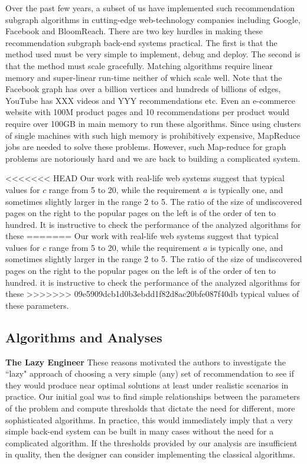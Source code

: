 Over the past few years, a subset of us have implemented such recommendation
subgraph algorithms in cutting-edge web-technology companies including Google,
Facebook and BloomReach. There are two key hurdles in making these
recommendation subgraph back-end systems practical. The first is that the method
used must be very simple to implement, debug and deploy. The second is that the
method must scale gracefully.  Matching algorithms require linear memory and
super-linear run-time neither of which scale well. Note that the Facebook graph
has over a billion vertices\cite{} and hundreds of billions of edges\cite{},
YouTube has XXX videos and YYY recommendations\cite{} etc. Even an e-commerce
website with 100M product pages and 10 recommendations per product would require
over 100GB in main memory to run these algorithms. Since using clusters of
single machines with such high memory is prohibitively expensive, MapReduce
\cite{} jobs are needed to solve these problems. However, such Map-reduce for
graph problems are notoriously hard and we are back to building a complicated
system. \vs

<<<<<<< HEAD
Our work with real-life web systems suggest that typical values for $c$ range
from 5 to 20, while the requirement $a$ is typically one, and sometimes slightly
larger in the range 2 to 5. The ratio of the size of undiscovered pages on the
right to the popular pages on the left is of the order of ten to hundred. It is
instructive to check the performance of the analyzed algorithms for these
=======
Our work with real-life web systems suggest that typical values for $c$ range
from 5 to 20, while the requirement $a$ is typically one, and sometimes slightly
larger in the range 2 to 5. The ratio of the size of undiscovered pages on the
right to the popular pages on the left is of the order of ten to hundred. it is
instructive to check the performance of the analyzed algorithms for these
>>>>>>> 09e5909dcb1d0b3ebdd1f82d8ac20bfe087f40db
typical values of these parameters.

\subsection{Algorithms and Analyses}

{\bf The Lazy Engineer}
These reasons motivated the authors to investigate the ``lazy" approach of
choosing a very simple (any) set of recommendation to see if they would produce
near optimal solutions at least under realistic scenarios in practice. Our
initial goal was to find simple relationships between the parameters of the
problem and compute thresholds that dictate the need for different, more
sophisticated algorithms. In practice, this would immediately imply that a very
simple back-end system can be built in many cases without the need for a
complicated algorithm. If the thresholds provided by our analysis are
insufficient in quality, then the designer can consider implementing the
classical algorithms. \vs

